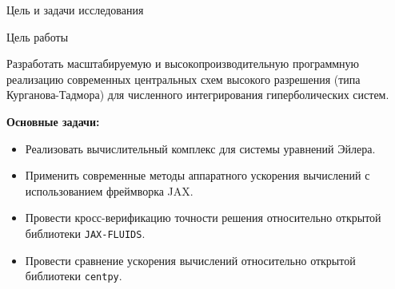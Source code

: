 \documentclass[ignoreonframetext,unicode,aspectratio=169]{beamer}
\begin{document}
	\begin{frame}{Цель и задачи исследования}
		
		\begin{block}{Цель работы}
			
			Разработать масштабируемую и высокопроизводительную программную реализацию современных центральных схем высокого разрешения (типа Курганова-Тадмора) для численного интегрирования гиперболических систем.
		\end{block}
		
		\vspace{0.3cm}
		
		\textbf{Основные задачи:}
		\begin{itemize}
			\item Реализовать вычислительный комплекс для системы уравнений Эйлера.
			\item Применить современные методы аппаратного ускорения вычислений с использованием фреймворка JAX.
			\item Провести кросс-верификацию точности решения относительно открытой библиотеки \texttt{JAX-FLUIDS}.
			\item Провести сравнение ускорения вычислений относительно открытой библиотеки \texttt{centpy}.
		\end{itemize}
		
	\end{frame}
	
\end{document}
